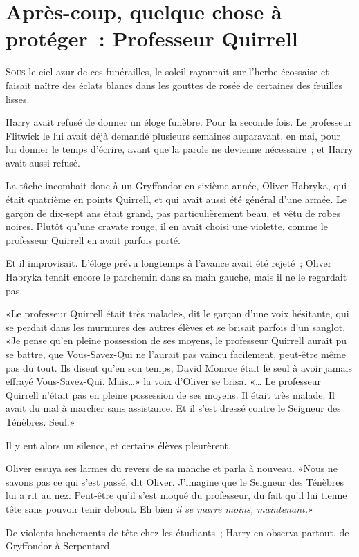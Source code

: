 \chapter{Après-coup, quelque chose à protéger~: Professeur Quirrell}

\lettrine{S}{ous} le ciel azur de ces funérailles, le soleil rayonnait sur l'herbe écossaise et faisait naître des éclats blancs dans les gouttes de rosée de certaines des feuilles lisses.

Harry avait refusé de donner un éloge funèbre. Pour la seconde fois. Le professeur Flitwick le lui avait déjà demandé plusieurs semaines auparavant, en mai, pour lui donner le temps d'écrire, avant que la parole ne devienne nécessaire~; et Harry avait aussi refusé.

La tâche incombait donc à un Gryffondor en sixième année, Oliver Habryka, qui était quatrième en points Quirrell, et qui avait aussi été général d'une armée. Le garçon de dix-sept ans était grand, pas particulièrement beau, et vêtu de robes noires. Plutôt qu'une cravate rouge, il en avait choisi une violette, comme le professeur Quirrell en avait parfois porté.

Et il improvisait. L'éloge prévu longtemps à l'avance avait été rejeté~; Oliver Habryka tenait encore le parchemin dans sa main gauche, mais il ne le regardait pas.

«Le professeur Quirrell était très malade», dit le garçon d'une voix hésitante, qui se perdait dans les murmures des autres élèves et se brisait parfois d'un sanglot. «Je pense qu'en pleine possession de ses moyens, le professeur Quirrell aurait pu se battre, que Vous-Savez-Qui ne l'aurait pas vaincu facilement, peut-être même pas du tout. Ils disent qu'en son temps, David Monroe était le seul à avoir jamais effrayé Vous-Savez-Qui. Mais…» la voix d'Oliver se brisa. «… Le professeur Quirrell n'était pas en pleine possession de ses moyens. Il était très malade. Il avait du mal à marcher sans assistance. Et il s'est dressé contre le Seigneur des Ténèbres. Seul.»

Il y eut alors un silence, et certains élèves pleurèrent.

Oliver essuya ses larmes du revers de sa manche et parla à nouveau. «Nous ne savons pas ce qui s'est passé, dit Oliver. J'imagine que le Seigneur des Ténèbres lui a rit au nez. Peut-être qu'il s'est moqué du professeur, du fait qu'il lui tienne tête sans pouvoir tenir debout. Eh bien \emph{il se marre moins, maintenant.}»

De violents hochements de tête chez les étudiants~; Harry en observa partout, de Gryffondor à Serpentard.

